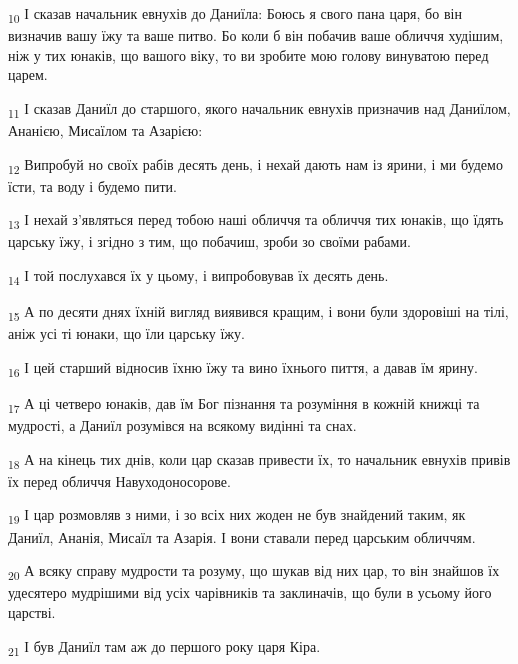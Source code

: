 \begin{tcolorbox}
\textsubscript{10} І сказав начальник евнухів до Даниїла: Боюсь я свого пана царя, бо він визначив вашу їжу та ваше питво. Бо коли б він побачив ваше обличчя худішим, ніж у тих юнаків, що вашого віку, то ви зробите мою голову винуватою перед царем.
\end{tcolorbox}
\begin{tcolorbox}
\textsubscript{11} І сказав Даниїл до старшого, якого начальник евнухів призначив над Даниїлом, Ананією, Мисаїлом та Азарією:
\end{tcolorbox}
\begin{tcolorbox}
\textsubscript{12} Випробуй но своїх рабів десять день, і нехай дають нам із ярини, і ми будемо їсти, та воду і будемо пити.
\end{tcolorbox}
\begin{tcolorbox}
\textsubscript{13} І нехай з'являться перед тобою наші обличчя та обличчя тих юнаків, що їдять царську їжу, і згідно з тим, що побачиш, зроби зо своїми рабами.
\end{tcolorbox}
\begin{tcolorbox}
\textsubscript{14} І той послухався їх у цьому, і випробовував їх десять день.
\end{tcolorbox}
\begin{tcolorbox}
\textsubscript{15} А по десяти днях їхній вигляд виявився кращим, і вони були здоровіші на тілі, аніж усі ті юнаки, що їли царську їжу.
\end{tcolorbox}
\begin{tcolorbox}
\textsubscript{16} І цей старший відносив їхню їжу та вино їхнього пиття, а давав їм ярину.
\end{tcolorbox}
\begin{tcolorbox}
\textsubscript{17} А ці четверо юнаків, дав їм Бог пізнання та розуміння в кожній книжці та мудрості, а Даниїл розумівся на всякому видінні та снах.
\end{tcolorbox}
\begin{tcolorbox}
\textsubscript{18} А на кінець тих днів, коли цар сказав привести їх, то начальник евнухів привів їх перед обличчя Навуходоносорове.
\end{tcolorbox}
\begin{tcolorbox}
\textsubscript{19} І цар розмовляв з ними, і зо всіх них жоден не був знайдений таким, як Даниїл, Ананія, Мисаїл та Азарія. І вони ставали перед царським обличчям.
\end{tcolorbox}
\begin{tcolorbox}
\textsubscript{20} А всяку справу мудрости та розуму, що шукав від них цар, то він знайшов їх удесятеро мудрішими від усіх чарівників та заклиначів, що були в усьому його царстві.
\end{tcolorbox}
\begin{tcolorbox}
\textsubscript{21} І був Даниїл там аж до першого року царя Кіра.
\end{tcolorbox}

